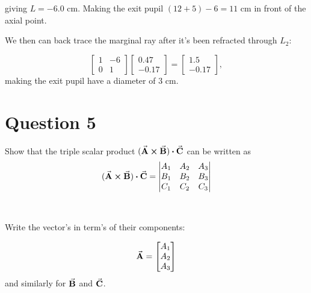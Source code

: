 \documentclass[a4paper]{article}
\begin{document}
giving $L=-6.0$ cm. Making the exit pupil $(12 + 5) - 6 = 11$ cm in front of the axial point.

We then can back trace the marginal ray after it's been refracted through $L_2$:

$$
\begin{bmatrix}
    1 & -6\\
    0 & 1
\end{bmatrix}
\begin{bmatrix}
    0.47\\
    -0.17 
\end{bmatrix}
=
\begin{bmatrix}
    1.5\\
    -0.17
\end{bmatrix},
$$
making the exit pupil have a diameter of $3$ cm.



\section*{Question 5}
Show that the triple scalar product $(\va{A} \cross \va{B}) \vdot \va{C}$ can be written as
$$ (\va{A} \cross \va{B}) \vdot \va{C} = 
    \begin{vmatrix}
    A_1 & A_2 & A_3 \\
    B_1 & B_2 & B_3 \\
    C_1 & C_2 & C_3 
    \end{vmatrix}  $$ \\\\

Write the vector's in term's of their components:

$$ \va{A} = \begin{bmatrix}
    A_1 \\
    A_2 \\
    A_3 \\
\end{bmatrix} $$
and similarly for $\va{B}$ and $\va{C}$.
\end{document}
